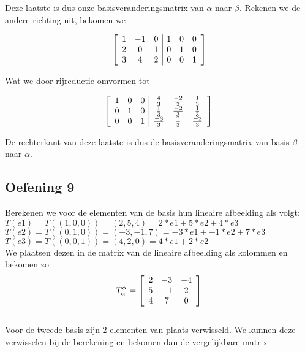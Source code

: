 \documentclass[lineaire_algebra_oplossingen.tex]{subfiles}
\begin{document}
Deze laatste is dus onze basisveranderingsmatrix van $\alpha$ naar $\beta$. Rekenen we de andere richting uit, bekomen we

\[
\left[
\begin{array}{ c c c | c c c }
1 & -1 & 0 & 1 & 0 & 0\\
2 & 0 & 1 & 0 & 1 & 0\\
3 & 4 & 2 & 0 & 0 & 1
\end{array}
\right]
\]

Wat we door rijreductie omvormen tot

\[
\left[
\begin{array}{ c c c | c c c }
1 & 0 & 0 & \frac{4}{3} & \frac{-2}{3} & \frac{1}{3}\\
0 & 1 & 0 & \frac{1}{3} & \frac{-2}{3} & \frac{1}{3}\\
0 & 0 & 1 & \frac{-8}{3} & \frac{7}{3} & \frac{-2}{3}
\end{array}
\right]
\]

De rechterkant van deze laatste is dus de basisveranderingsmatrix van basis $\beta$ naar $\alpha$.

\subsection{Oefening 9}

Berekenen we voor de elementen van de basis hun lineaire afbeelding als volgt:\\

$T(e1) = T( (1,0,0) ) = (2,5,4) = 2 * e1 + 5 * e2 + 4 * e3$\\

$T(e2) = T( (0,1,0) ) = (-3,-1,7) = -3 * e1 + -1 * e2 + 7 * e3$\\

$T(e3) = T( (0,0,1) ) = (4,2,0) = 4 * e1 + 2 * e2$\\

We plaatsen dezen in de matrix van de lineaire afbeelding als kolommen en bekomen zo\\

\[
T^{\alpha}_{\alpha} =
\left[
\begin{array}{c c c}
2 & -3 & -4\\
5 & -1 & 2\\
4 & 7 & 0
\end{array}
\right]
\]\\

Voor de tweede basis zijn 2 elementen van plaats verwisseld. We kunnen deze verwisselen bij de berekening en bekomen dan de vergelijkbare matrix
\end{document}

